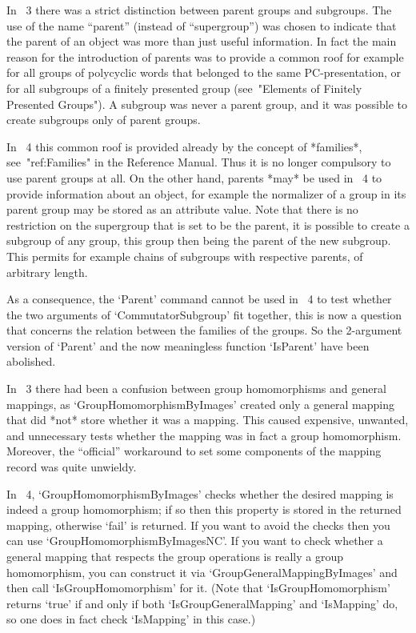 In {\GAP}~3 there was a strict distinction between parent groups and
subgroups.
The use of the name ``parent'' (instead of ``supergroup'')
was chosen to indicate that the parent of an object was more than just
useful information.
In fact the main reason for the introduction of parents was to provide
a common roof for example for all groups of polycyclic words that
belonged to the same PC-presentation, or for all subgroups of a finitely
presented group (see~"Elements of Finitely Presented Groups").
A subgroup was never a parent group, and it was possible to create
subgroups only of parent groups.

In {\GAP}~4 this common roof is provided already by the concept of
*families*, see~"ref:Families" in the Reference Manual.
Thus it is no longer compulsory to use parent groups at all.
On the other hand, parents *may* be used in {\GAP}~4 to provide
information about an object, for example the normalizer of a group in its
parent group may be stored as an attribute value.
Note that there is no restriction on the supergroup that is set to be
the parent,
it is possible to create a subgroup of
any group, this group then being the parent of the new subgroup.
This permits for example chains of subgroups with respective parents,
of arbitrary length.

As a consequence, the `Parent' command cannot be used in {\GAP}~4 to
test whether the two arguments of `CommutatorSubgroup' fit together,
this is now a question that concerns the relation between the families
of the groups.  So the 2-argument version of `Parent' and the now
meaningless function `IsParent' have been abolished.



In {\GAP}~3 there had been a confusion between group homomorphisms and
general mappings, as `GroupHomomorphismByImages' created only a
general mapping that did *not* store whether it was a mapping.  This
caused expensive, unwanted, and unnecessary tests whether the mapping
was in fact a group homomorphism.  Moreover, the ``official''
workaround to set some components of the mapping record was quite
unwieldy.

In {\GAP}~4, `GroupHomomorphismByImages' checks whether the desired
mapping is indeed a group homomorphism; if so then this property is
stored in the returned mapping, otherwise `fail' is returned.  If you
want to avoid the checks then you can use
`GroupHomomorphismByImagesNC'.  If you want to check whether a general
mapping that respects the group operations is really a group
homomorphism, you can construct it via `GroupGeneralMappingByImages'
and then call `IsGroupHomomorphism' for it.  (Note that
`IsGroupHomomorphism' returns `true' if and only if both
`IsGroupGeneralMapping' and `IsMapping' do, so one does in fact check
`IsMapping' in this case.)

